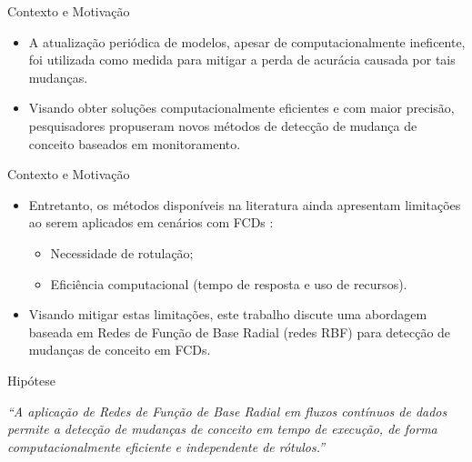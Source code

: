 \documentclass[10pt]{beamer}
\begin{document}
\begin{frame}{Contexto e Motivação}
    \begin{itemize}
        \item<1 -> A atualização periódica de modelos, apesar de computacionalmente ineficente, foi utilizada como medida para mitigar a perda de acurácia causada por tais mudanças.
        \item<2 -> Visando obter soluções computacionalmente eficientes e com maior precisão, pesquisadores propuseram novos métodos de detecção de mudança de conceito baseados em monitoramento.
      \end{itemize}
\end{frame}


\begin{frame}{Contexto e Motivação}
    \begin{itemize}
        \item<1 -> Entretanto, os métodos disponíveis na literatura ainda apresentam limitações ao serem aplicados em cenários com FCDs \cite{Aggarwal:2006:DSM:1196418}:
        \begin{itemize}
            \item<2 -> Necessidade de rotulação;
            \item<2 -> Eficiência computacional (tempo de resposta e uso de recursos).
        \end{itemize}
        \item<3 -> Visando mitigar estas limitações, este trabalho discute uma abordagem baseada em \alert{Redes de Função de Base Radial (redes RBF)} para detecção de mudanças de conceito em FCDs.
      \end{itemize}
\end{frame}


\begin{frame}{Hipótese}

    \begin{center}
        \textit{``A aplicação de Redes de Função de Base Radial em fluxos contínuos de dados permite a detecção de mudanças de conceito em tempo de execução, de forma computacionalmente eficiente e independente de rótulos.''}
    \end{center}

\end{frame}
\end{document}
